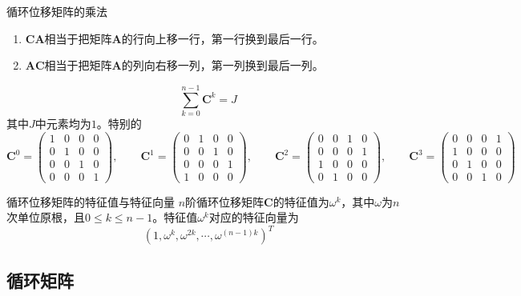 \documentclass[lang = cn, scheme = chinese, thmcnt = section]{elegantbook}
\newcommand{\bs}{\boldsymbol}          %
\begin{document}
\begin{proposition}{循环位移矩阵的乘法}
	\begin{enumerate}
		\item $\bs{C}\bs{A}$相当于把矩阵$\bs{A}$的行向上移一行，第一行换到最后一行。
		\item $\bs{A}\bs{C}$相当于把矩阵$\bs{A}$​的列向右移一列，第一列换到最后一列。
	\end{enumerate}
\end{proposition}

\begin{proposition}
	$$
	\sum_{k=0}^{n-1}\bs{C}^k=J
	$$
	其中$J$中元素均为$1$​​。特别的
	$$
	\bs{C}^0=\begin{pmatrix}
		1 & 0 & 0 & 0\\
		0 & 1 & 0 & 0\\
		0 & 0 & 1 & 0\\
		0 & 0 & 0 & 1
	\end{pmatrix},\qquad 
	\bs{C}^1=\begin{pmatrix}
		0 & 1 & 0 & 0\\
		0 & 0 & 1 & 0\\
		0 & 0 & 0 & 1\\
		1 & 0 & 0 & 0
	\end{pmatrix},\qquad 
	\bs{C}^2=\begin{pmatrix}
		0 & 0 & 1 & 0\\
		0 & 0 & 0 & 1\\
		1 & 0 & 0 & 0\\
		0 & 1 & 0 & 0
	\end{pmatrix},\qquad 
	\bs{C}^3=\begin{pmatrix}
		0 & 0 & 0 & 1\\
		1 & 0 & 0 & 0\\
		0 & 1 & 0 & 0\\
		0 & 0 & 1 & 0
	\end{pmatrix}
	$$
\end{proposition}

\begin{proposition}{循环位移矩阵的特征值与特征向量}
	$n$阶循环位移矩阵$\bs{C}$的特征值为$\omega^k$，其中$\omega$为$n$次单位原根，且$0\le k \le n-1$。特征值$\omega^k$对应的特征向量为%
	$$
	(1,\omega^k,\omega^{2k},\cdots,\omega^{(n-1)k})^T
	$$
\end{proposition}

\subsection{循环矩阵}
\end{document}
